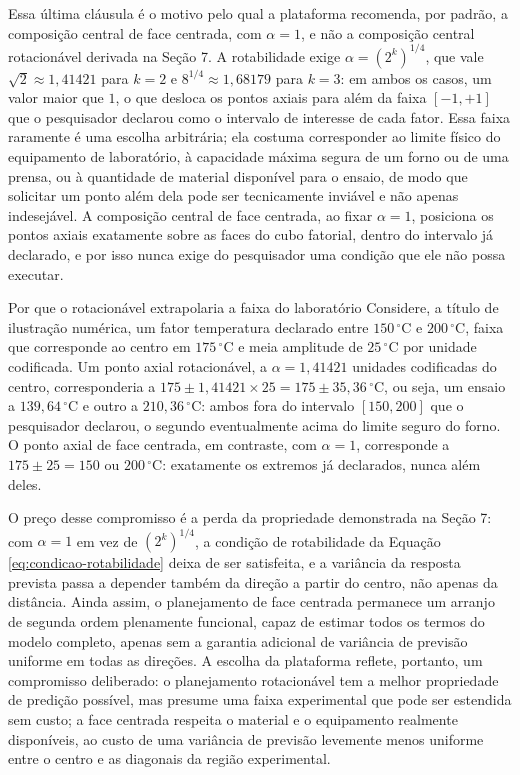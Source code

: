 \documentclass{doeapostila}
\begin{document}
Essa última cláusula é o motivo pelo qual a plataforma recomenda, por
padrão, a composição central de face centrada, com $\alpha=1$, e não a
composição central rotacionável derivada na Seção 7. A rotabilidade exige
$\alpha=(2^{k})^{1/4}$, que vale $\sqrt{2}\approx1{,}41421$ para $k=2$ e
$8^{1/4}\approx1{,}68179$ para $k=3$: em ambos os casos, um valor maior que
$1$, o que desloca os pontos axiais para além da faixa $[-1,+1]$ que o
pesquisador declarou como o intervalo de interesse de cada fator. Essa
faixa raramente é uma escolha arbitrária; ela costuma corresponder ao
limite físico do equipamento de laboratório, à capacidade máxima segura de
um forno ou de uma prensa, ou à quantidade de material disponível para o
ensaio, de modo que solicitar um ponto além dela pode ser tecnicamente
inviável e não apenas indesejável. A composição central de face centrada,
ao fixar $\alpha=1$, posiciona os pontos axiais exatamente sobre as faces
do cubo fatorial, dentro do intervalo já declarado, e por isso nunca exige
do pesquisador uma condição que ele não possa executar.

\begin{aplicacao}{Por que o rotacionável extrapolaria a faixa do laboratório}
Considere, a título de ilustração numérica, um fator temperatura declarado
entre $150\,^{\circ}\mathrm{C}$ e $200\,^{\circ}\mathrm{C}$, faixa que
corresponde ao centro em $175\,^{\circ}\mathrm{C}$ e meia amplitude de
$25\,^{\circ}\mathrm{C}$ por unidade codificada. Um ponto axial
rotacionável, a $\alpha=1{,}41421$ unidades codificadas do centro,
corresponderia a $175 \pm 1{,}41421 \times 25 = 175\pm35{,}36\,^{\circ}
\mathrm{C}$, ou seja, um ensaio a $139{,}64\,^{\circ}\mathrm{C}$ e outro a
$210{,}36\,^{\circ}\mathrm{C}$: ambos fora do intervalo $[150,200]$ que o
pesquisador declarou, o segundo eventualmente acima do limite seguro do
forno. O ponto axial de face centrada, em contraste, com $\alpha=1$,
corresponde a $175\pm25=150$ ou $200\,^{\circ}\mathrm{C}$: exatamente os
extremos já declarados, nunca além deles.
\end{aplicacao}

O preço desse compromisso é a perda da propriedade demonstrada na Seção 7:
com $\alpha=1$ em vez de $(2^{k})^{1/4}$, a condição de rotabilidade da
Equação \eqref{eq:condicao-rotabilidade} deixa de ser satisfeita, e a
variância da resposta prevista passa a depender também da direção a partir
do centro, não apenas da distância. Ainda assim, o planejamento de face
centrada permanece um arranjo de segunda ordem plenamente funcional, capaz
de estimar todos os termos do modelo completo, apenas sem a garantia
adicional de variância de previsão uniforme em todas as direções. A escolha
da plataforma reflete, portanto, um compromisso deliberado: o planejamento
rotacionável tem a melhor propriedade de predição possível, mas presume uma
faixa experimental que pode ser estendida sem custo; a face centrada
respeita o material e o equipamento realmente disponíveis, ao custo de uma
variância de previsão levemente menos uniforme entre o centro e as
diagonais da região experimental.
\end{document}

